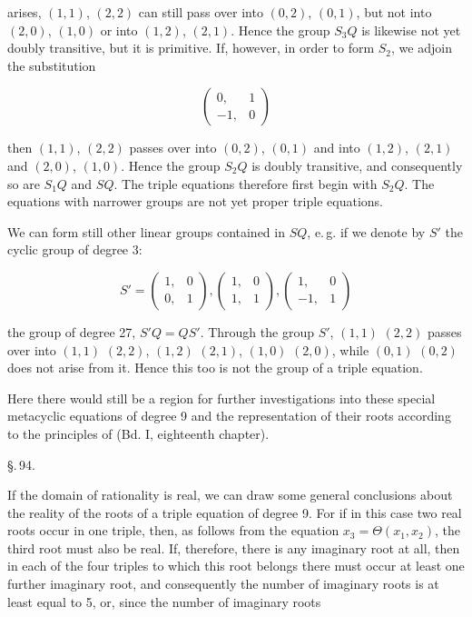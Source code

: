 arises, $(1,1)$, $(2,2)$ can still pass over into $(0,2)$, $(0,1)$, but not into
$(2,0)$, $(1,0)$ or into $(1,2)$, $(2,1)$. Hence the group $S_3 Q$ is likewise not yet
doubly transitive, but it is primitive. If, however, in order to form $S_2$,
we adjoin the substitution

\[
\begin{pmatrix} 0, & 1 \\ -1, & 0 \end{pmatrix}
\]

then $(1,1)$, $(2,2)$ passes over into $(0,2)$, $(0,1)$ and into $(1,2)$, $(2,1)$ and
$(2,0)$, $(1,0)$. Hence the group $S_2 Q$ is doubly transitive, and consequently so are
$S_1 Q$ and $S Q$. The triple equations therefore first begin with $S_2 Q$.
The equations with narrower groups are not yet proper triple equations.

We can form still other linear groups contained in $S Q$, e.\,g. if we
denote by $S'$ the cyclic group of degree 3:

\[
S' = \begin{pmatrix} 1, & 0 \\ 0, & 1 \end{pmatrix}, \begin{pmatrix} 1, & 0 \\ 1, & 1 \end{pmatrix}, \begin{pmatrix} 1, & 0 \\ -1, & 1 \end{pmatrix}
\]

the group of degree 27, $S' Q = Q S'$. Through the group $S'$,
$(1,1)$ $(2,2)$ passes over into $(1,1)$ $(2,2)$, $(1,2)$ $(2,1)$, $(1,0)$ $(2,0)$, while
$(0,1)$ $(0,2)$ does not arise from it. Hence this too is not the group of a
triple equation.

Here there would still be a region for further investigations into these special
metacyclic equations of degree 9 and the representation of their
roots according to the principles of  (Bd. I, eighteenth chapter).

\begin{center}
\S.\,94.\\[2pt]
\end{center}

If the domain of rationality is real, we can draw some general conclusions
about the reality of the roots of a triple equation of degree 9.
For if in this case two real roots occur in one triple, then,
as follows from the equation $x_3 = \Theta (x_1, x_2)$, the third root must also be
real. If, therefore, there is any imaginary root at all, then in each of the
four triples to which this root belongs there must occur at least one further imaginary
root, and consequently the number of imaginary roots is at least equal to 5,
or, since the number of imaginary roots
